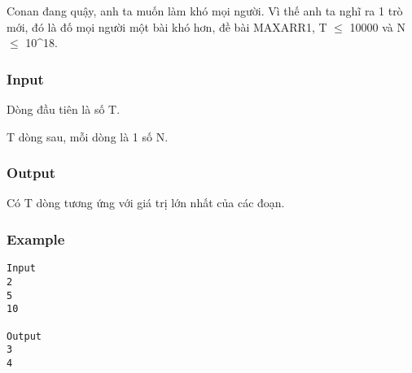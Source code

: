 



   Conan đang quậy, anh ta muốn làm khó mọi người. Vì thế anh ta nghĩ ra 1 trò mới, đó là đố mọi người một bài khó hơn, đề bài MAXARR1, T  $\le$  10000 và N  $\le$  10\textasciicircum18.  

\subsubsection{   Input  }

   Dòng đầu tiên là số T.  

   T dòng sau, mỗi dòng là 1 số N.  

\subsubsection{   Output  }

   Có T dòng tương ứng với giá trị lớn nhất của các đoạn.  

\subsubsection{   Example  }
\begin{verbatim}
Input
2
5
10

Output
3
4
\end{verbatim}
